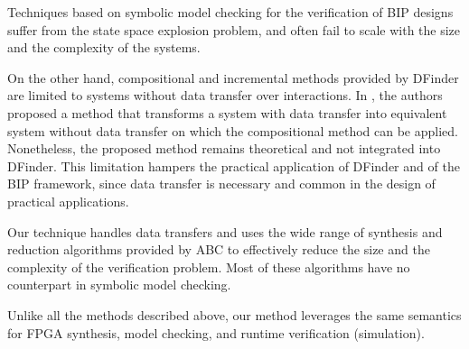 Techniques based on symbolic model checking for the verification of 
BIP designs suffer from the state space explosion problem, and often 
fail to scale with the size and the complexity of the systems. 



On the other hand, compositional and incremental methods provided by DFinder are limited to systems without data
transfer over interactions. In \cite{hungthesis10}, the authors proposed a method that transforms a system with data transfer into equivalent system without data transfer on which the compositional method can be applied. Nonetheless, the proposed method remains theoretical and not integrated into DFinder. This limitation hampers the practical application of DFinder and of the BIP framework, since data transfer is necessary and common in the design of practical applications.


Our technique handles data transfers and uses the wide range of synthesis 
and reduction algorithms provided by ABC to effectively reduce the size and 
the complexity of the verification problem. Most of these algorithms have no counterpart
in symbolic model checking.  

Unlike all the methods described above, our method leverages
the same semantics for FPGA synthesis, model checking, 
and runtime verification (simulation). 
